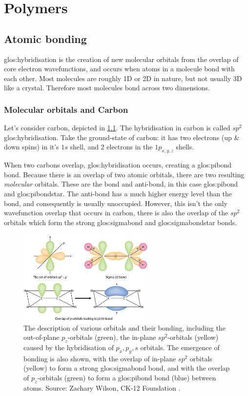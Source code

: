 \documentclass[../main.tex]{subfiles}
\begin{document}
	\chapter{Polymers}\label{chap:02-polymers}
		\section{Atomic bonding}\label{sec:ch2-cbonding}
			\Gls{glos:hybridisation} is the creation of new molecular orbitals from the overlap of core electron wavefunctions, and occurs when atoms in a molecule bond with each other. Most molecules are roughly 1D or 2D in nature, but not usually 3D like a crystal. Therefore most molecules bond across two dimensions.
			
			\subsection{Molecular orbitals and Carbon}
				Let's consider carbon, depicted in \cref{fig:ch2-sigma-pi-bonds}. The hybridisation in carbon is called $sp^2$ \gls{glos:hybridisation}. Take the ground-state of carbon: it has two electrons (up \& down spins) in it's $1s$ shell, and 2 electrons in the $1p_{x,y,z}$ shells.
				
				When two carbons overlap, \gls{glos:hybridisation} occurs, creating a \gls{glos:pibond} bond. Because there is an overlap of two atomic orbitals, there are two resulting \textit{molecular} orbitals. These are the bond and anti-bond, in this case \gls{glos:pibond} and \gls{glos:pibondstar}. The anti-bond has a much higher energy level than the bond, and consequently is usually unoccupied.
				However, this isn't the only wavefunction overlap that occurs in carbon, there is also the overlap of the $sp^2$ orbitals which form the strong \gls{glos:sigmabond} and \gls{glos:sigmabondstar} bonds.
				
				\begin{figure}[]
					\centering
					\includegraphics[width=0.6\textwidth]{resources/ch2/ZachWilson-CK12-Sigma-Pi-Bonds}
					\caption{The description of various orbitals and their bonding, including the out-of-plane $p_z$-orbitals (green), the in-plane $sp^2$-orbitals (yellow) caused by the hybridisation of $p_x, p_y, s$ orbitals. The emergence of bonding is also shown, with the overlap of in-plane $sp^2$ orbitals (yellow) to form a strong \gls{glos:sigmabond} bond, and with the overlap of $p_z$-orbitals (green) to form a \gls{glos:pibond} bond (blue) between atoms. Source: Zachary Wilson, CK-12 Foundation \autocite{wilson_924_2016}.}
					\label{fig:ch2-sigma-pi-bonds}
				\end{figure}
			
\end{document}
